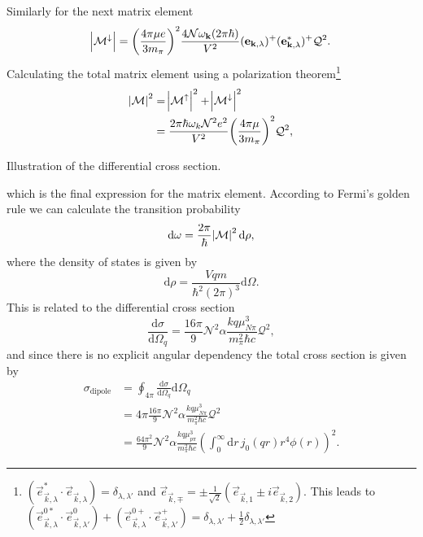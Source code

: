 Similarly for the next matrix element
\begin{equation}
    \abs{\mathcal{M}^\downarrow} = \bigg( \frac{4\pi \mu e}{3 m_\pi}\bigg)^2 \frac{4\mathcal{N}\omega_{\bm{\mathrm{k}}}(2\pi\hbar)}{V^2}(\bm{\mathrm{e}}_{\bm{\mathrm{k}},\lambda})^+(\bm{\mathrm{e}}_{\bm{\mathrm{k}},\lambda}^*)^+ \mathcal{Q}^2.
\end{equation}
Calculating the total matrix element using a polarization theorem\footnote{$(\vec{e}_{\vec{k},\lambda}^*\cdot \vec{e}_{\vec{k},\lambda})=\delta_{\lambda,\lambda'}$ and $\vec{e}_{\vec{k},\mp}=\pm\frac{1}{\sqrt{2}}(\vec{e}_{\vec{k},1}\pm i\vec{e}_{\vec{k},2})$. This leads to $(\vec{e}^{0*}_{\vec{k},\lambda}\cdot\vec{e}^{0}_{\vec{k},\lambda'})+(\vec{e}^{0+}_{\vec{k},\lambda}\cdot\vec{e}^{+}_{\vec{k},\lambda'})=\delta_{\lambda,\lambda'}+\frac{1}{2}\delta_{\lambda,\lambda'}$}
\begin{align}
    \abs{\mathcal{M}}^2 &= \abs{\mathcal{M}^\uparrow}^2 + \abs{\mathcal{M}^\downarrow}^2 \\
    &= \frac{2\pi \hbar \omega_k \mathcal{N}^2 e^2}{V^2} \bigg( \frac{4\pi\mu}{3m_\pi}\bigg)^2 \mathcal{Q}^2,
\end{align}
\begin{marginfigure}
\centering

\caption{Illustration of the differential cross section. }
\label{fig:diffcrossillustration}
\end{marginfigure}  
which is the final expression for the matrix element. According to Fermi's golden rule we can calculate the transition probability
\begin{equation}\label{domega}
    \text{d}\omega = \frac{2\pi}{\hbar} \abs{\mathcal{M}}^2 \text{d}\rho,
\end{equation}
where the density of states is given by
\begin{equation}\label{densityofstates}
    \text{d}\rho = \frac{Vqm }{\hbar^2 (2\pi)^3}\text{d}\Omega.
\end{equation}
This is related to the differential cross section 
\begin{equation}\label{diffcrosssection}
    \frac{\text{d}\sigma}{\text{d}\Omega_q}=\frac{16 \pi}{9} \mathcal{N}^2 \alpha\frac{kq\mu^3_{N\pi}}{m_\pi^2 \hbar c}\mathcal{Q}^2,
\end{equation}
and since there is no explicit angular dependency the total cross section is given by
\begin{align}
    \sigma_\text{dipole} & = \oint_{4\pi} \frac{\text{d}\sigma}{\text{d}\Omega_q} \text{d}\Omega_q \\
    &= 4\pi \frac{16 \pi}{9} \mathcal{N}^2 \alpha\frac{kq\mu^3_{N\pi}}{m_\pi^2 \hbar c}\mathcal{Q}^2 \\
    &= \frac{64\pi^2}{9}\mathcal{N}^2 \alpha \frac{kq\mu^3_{p\pi}}{m_\pi^2 \hbar c} \left( \int_0^\infty \text{d}r \, j_0(qr)r^4 \phi(r)\right)^2 \label{dipoletotalcross}.
\end{align}
